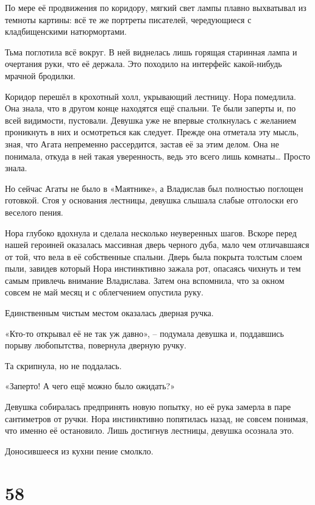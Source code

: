 \documentclass[
  a5paperpaper,
  DIV=11,
  numbers=noendperiod]{scrreprt}
\begin{document}
По мере её продвижения по коридору, мягкий свет лампы плавно выхватывал
из темноты картины: всё те же портреты писателей, чередующиеся с
кладбищенскими натюрмортами.

Тьма поглотила всё вокруг. В ней виднелась лишь горящая старинная лампа
и очертания руки, что её держала. Это походило на интерфейс какой-нибудь
мрачной бродилки.

Коридор перешёл в крохотный холл, укрывающий лестницу. Нора помедлила.
Она знала, что в другом конце находятся ещё спальни. Те были заперты и,
по всей видимости, пустовали. Девушка уже не впервые столкнулась с
желанием проникнуть в них и осмотреться как следует. Прежде она отметала
эту мысль, зная, что Агата непременно рассердится, застав её за этим
делом. Она не понимала, откуда в ней такая уверенность, ведь это всего
лишь комнаты\ldots{} Просто знала.

Но сейчас Агаты не было в «Маятнике», а Владислав был полностью поглощен
готовкой. Стоя у основания лестницы, девушка слышала слабые отголоски
его веселого пения.

Нора глубоко вдохнула и сделала несколько неуверенных шагов. Вскоре
перед нашей героиней оказалась массивная дверь черного дуба, мало чем
отличавшаяся от той, что вела в её собственные спальни. Дверь была
покрыта толстым слоем пыли, завидев который Нора инстинктивно зажала
рот, опасаясь чихнуть и тем самым привлечь внимание Владислава. Затем
она вспомнила, что за окном совсем не май месяц и с облегчением опустила
руку.

Единственным чистым местом оказалась дверная ручка.

«Кто-то открывал её не так уж давно», -- подумала девушка и, поддавшись
порыву любопытства, повернула дверную ручку.

Та скрипнула, но не поддалась.

«Заперто! А чего ещё можно было ожидать?»

Девушка собиралась предпринять новую попытку, но её рука замерла в паре
сантиметров от ручки. Нора инстинктивно попятилась назад, не совсем
понимая, что именно её остановило. Лишь достигнув лестницы, девушка
осознала это.

Доносившееся из кухни пение смолкло.

\section*{58}\label{58}

\end{document}
